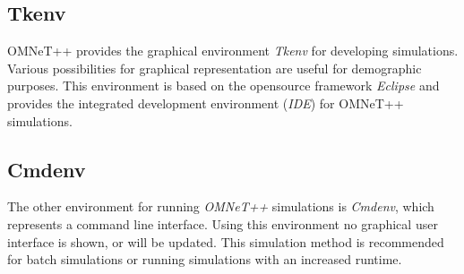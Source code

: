 \subsection{Tkenv}
OMNeT++ provides the graphical environment \emph{Tkenv} for developing simulations.
Various possibilities for graphical representation are useful for demographic purposes.
This environment is based on the opensource framework \emph{Eclipse} and provides the integrated development environment (\emph{IDE}) for OMNeT++ simulations.

\subsection{Cmdenv}
The other environment for running \emph{OMNeT++} simulations is \emph{Cmdenv}, which represents a command line interface.
Using this environment no graphical user interface is shown, or will be updated.
This simulation method is recommended for batch simulations or running simulations with an increased runtime.